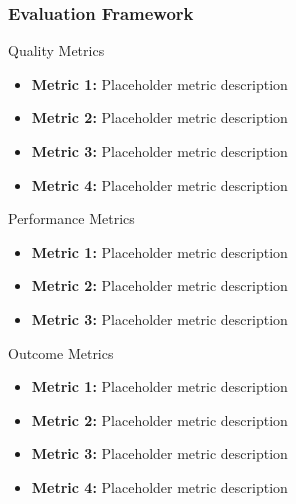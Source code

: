 \begin{frame}
\frametitle{Evaluation Framework}
\begin{block}{Quality Metrics}
\begin{itemize}
\item \textbf{Metric 1:} Placeholder metric description
\item \textbf{Metric 2:} Placeholder metric description
\item \textbf{Metric 3:} Placeholder metric description
\item \textbf{Metric 4:} Placeholder metric description
\end{itemize}
\end{block}

\begin{block}{Performance Metrics}
\begin{itemize}
\item \textbf{Metric 1:} Placeholder metric description
\item \textbf{Metric 2:} Placeholder metric description
\item \textbf{Metric 3:} Placeholder metric description
\end{itemize}
\end{block}

\begin{block}{Outcome Metrics}
\begin{itemize}
\item \textbf{Metric 1:} Placeholder metric description
\item \textbf{Metric 2:} Placeholder metric description
\item \textbf{Metric 3:} Placeholder metric description
\item \textbf{Metric 4:} Placeholder metric description
\end{itemize}
\end{block}
\end{frame}

